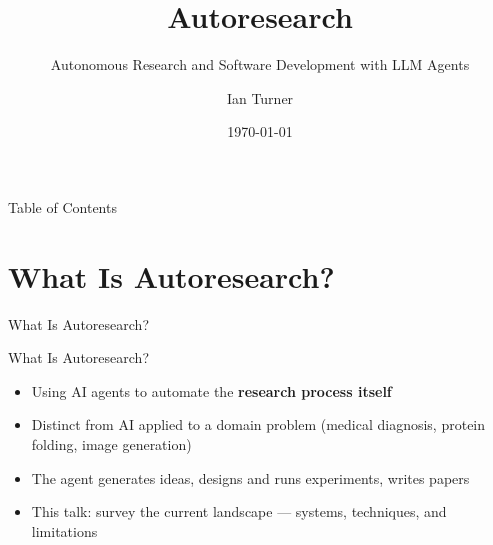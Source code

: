 \documentclass[aspectratio=169]{beamer}
\title{Autoresearch}
\subtitle{Autonomous Research and Software Development with LLM Agents}
\author{Ian Turner}
\date{\today}
\begin{document}
\begin{frame}
  \titlepage
\end{frame}

\begin{frame}{Table of Contents}
  \tableofcontents
\end{frame}

\section{What Is Autoresearch?}

\begin{frame}{}
  \centering
  \Large What Is Autoresearch?
\end{frame}

\begin{frame}{What Is Autoresearch?}
  \begin{itemize}
    \item Using AI agents to automate the \textbf{research process itself}
    \item Distinct from AI applied to a domain problem (medical diagnosis, protein folding, image generation)
    \item The agent generates ideas, designs and runs experiments, writes papers
    \item This talk: survey the current landscape --- systems, techniques, and limitations
  \end{itemize}
\end{frame}
\end{document}
